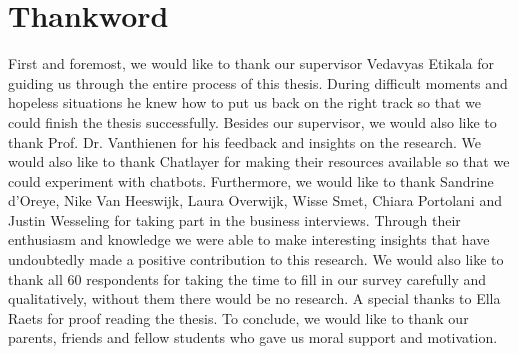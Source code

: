 \chapter*{Thankword\hfill} 
\label{ch:thankword}
First and foremost, we would like to thank our supervisor Vedavyas Etikala for guiding us through the entire process of this thesis. During difficult moments and hopeless situations he knew how to put us back on the right track so that we could finish the thesis successfully. Besides our supervisor, we would also like to thank Prof. Dr. Vanthienen for his feedback and insights on the research. We would also like to thank Chatlayer for making their resources available so that we could experiment with chatbots. Furthermore, we would like to thank Sandrine d'Oreye, Nike Van Heeswijk, Laura Overwijk, Wisse Smet, Chiara Portolani and Justin Wesseling for taking part in the business interviews. Through their enthusiasm and knowledge we were able to make interesting insights that have undoubtedly made a positive contribution to this research. We would also like to thank all 60 respondents for taking the time to fill in our survey carefully and qualitatively, without them there would be no research. A special thanks to Ella Raets for proof reading the thesis. To conclude, we would like to thank our parents, friends and fellow students who gave us moral support and motivation.
